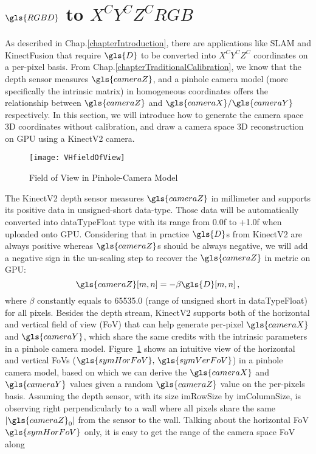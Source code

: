 \section{\(\gls{RGBD}\) to \(X^CY^CZ^CRGB\)}
\label{sectionCameraSpaceReconstruction}
As described in Chap.\ref{chapterIntroduction}, there are applications like \gls{SLAM} and KinectFusion that require \(\gls{D}\) to be converted into \(X^CY^CZ^C\) coordinates on a per-pixel basis. From Chap.\ref{chapterTraditionalCalibration}, we know that the depth sensor measures \(\gls{cameraZ}\), and a pinhole camera model (more specifically the intrinsic matrix) in homogeneous coordinates offers the relationship between \(\gls{cameraZ}\) and \(\gls{cameraX}/\gls{cameraY}\) respectively. In this section, we will introduce how to generate the camera space \gls{3D} coordinates without calibration, and draw a camera space \gls{3D} reconstruction on \gls{GPU} using a \gls{KinectV2} camera.
\\\indent
%
\begin{figure}[!b]
\centering
\texttt{[image: VHfieldOfView]}
\caption{Field of View in Pinhole-Camera Model}
\label{VHfieldOfView}
\end{figure}%
%
The \gls{KinectV2} depth sensor measures \(\gls{cameraZ}\) in millimeter and supports its positive data in unsigned-short data-type. Those data will be automatically converted into \gls{dataTypeFloat} type with its range from 0.0f to +1.0f when uploaded onto \gls{GPU}. Considering that in practice \(\gls{D}\)s from \gls{KinectV2} are always positive whereas \(\gls{cameraZ}\)s should be always negative, we will add a negative sign in the un-scaling step to recover the \(\gls{cameraZ}\) in metric on \gls{GPU}:
\begin{equation}
\gls{cameraZ} [m, n] = - \beta \gls{D} [m, n] \, ,
\label{unscalingZc}
\end{equation}%
\noindent
where \(\beta\) constantly equals to 65535.0 (range of unsigned short in \gls{dataTypeFloat}) for all pixels. Besides the depth stream, \gls{KinectV2} supports both of the horizontal and vertical field of view (\gls{FoV}) that can help generate per-pixel \(\gls{cameraX}\) and \(\gls{cameraY}\), which share the same credits with the intrinsic parameters in a pinhole camera model. Figure~\ref{VHfieldOfView} shows an intuitive view of the horizontal and vertical FoVs (\(\gls{symHorFoV}, \, \gls{symVerFoV}\)) in a pinhole camera model, based on which we can derive the \(\gls{cameraX}\) and \(\gls{cameraY}\) values given a random \(\gls{cameraZ}\) value on the per-pixels basis. Assuming the depth sensor, with its size \gls{imRowSize} by \gls{imColumnSize}, is observing right perpendicularly to a wall where all pixels share the same \(|\gls{cameraZ}_0|\) from the sensor to the wall. Talking about the horizontal \gls{FoV} \(\gls{symHorFoV}\) only, it is easy to get the range of the camera space \gls{FoV} along 
